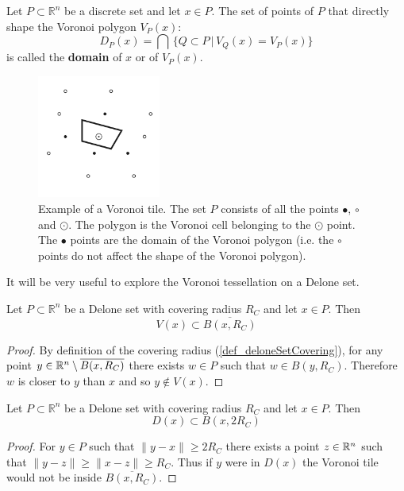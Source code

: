 \documentclass[text.tex]{subfiles}
\begin{document}
\begin{definition}
Let $P\subset \mathbb{R}^n$ be a discrete set and let $x\in P$. The set of points of $P$ that directly shape the Voronoi polygon $V_P(x)$:
$$D_P(x) = \bigcap\, \big\{ Q\subset P\,|\, V_Q(x) = V_P(x) \big\}$$
is called the \textbf{domain} of $x$ or of $V_P(x)$. 
\end{definition}

\begin{figure}[h!]
\centering
\includegraphics[width=0.36\textwidth]{img/preliminaries/voronoi}
\caption{Example of a Voronoi tile. The set $P$ consists of all the points $\bullet$, $\circ$ and $\odot$. The polygon is the Voronoi cell belonging to the $\odot$ point. The $\bullet$ points are the domain of the Voronoi polygon (i.e. the $\circ$ points do not affect the shape of the Voronoi polygon).}
\label{fig_voronoiExample}
\end{figure}

It will be very useful to explore the Voronoi tessellation on a Delone set. 

\begin{theorem}
Let $P\subset \mathbb{R}^n$ be a Delone set with covering radius $R_C$ and let $x\in P$. Then 
$$V(x)\subset \overline{B(x,R_C)}$$
\end{theorem}
\begin{proof}
By definition of the covering radius (\ref{def_deloneSetCovering}), for any point $y\in \mathbb{R}^n\setminus \overline{B(x,R_C)}$ there exists $w\in P$ such that $w\in B(y,R_C)$. Therefore $w$ is closer to $y$ than $x$ and so $y\not\in V(x)$.
\end{proof}

\begin{theorem}\label{the_voronoiDomainLimit}
Let $P\subset \mathbb{R}^n$ be a Delone set with covering radius $R_C$ and let $x\in P$. Then 
$$D(x)\subset B(x,2R_C)$$
\end{theorem}
\begin{proof}
For $y\in P$ such that $\lVert y-x \rVert \geq 2R_C$ there exists a point $z\in\mathbb{R}^n$ such that $\lVert y-z\rVert\geq\lVert x-z\rVert \geq R_C$. Thus if $y$ were in $D(x)$ the Voronoi tile would not be inside $\overline{B(x,R_C)}$. 
\end{proof}
\end{document}
